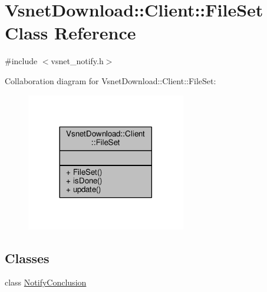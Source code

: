 \hypertarget{classVsnetDownload_1_1Client_1_1FileSet}{}\section{Vsnet\+Download\+:\+:Client\+:\+:File\+Set Class Reference}
\label{classVsnetDownload_1_1Client_1_1FileSet}


{\ttfamily \#include $<$vsnet\+\_\+notify.\+h$>$}



Collaboration diagram for Vsnet\+Download\+:\+:Client\+:\+:File\+Set\+:
\nopagebreak
\begin{figure}[H]
\begin{center}
\leavevmode
\includegraphics[width=197pt]{d1/d72/classVsnetDownload_1_1Client_1_1FileSet__coll__graph}
\end{center}
\end{figure}
\subsection*{Classes}
\begin{DoxyCompactItemize}
\item 
class \hyperlink{classVsnetDownload_1_1Client_1_1FileSet_1_1NotifyConclusion}{Notify\+Conclusion}
\end{DoxyCompactItemize}
